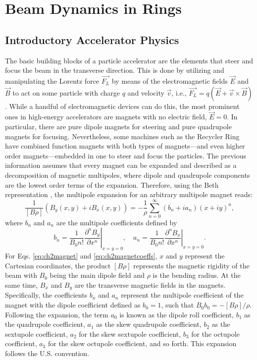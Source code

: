 \chapter{Beam Dynamics in Rings}
\label{sec:ch2}

\section{\label{sec:basic}Introductory Accelerator Physics}
The basic building blocks of a particle accelerator are the elements that steer and focus the beam in the transverse direction. This is done by utilizing and manipulating the Lorentz force $\vec{F_L}$ by means of the electromagnetic fields $\vec{E}$ and $\vec{B}$ to act on some particle with charge $q$ and velocity $\vec{v}$, i.e., $\vec{F_L}=q\left( \vec{E}+\vec{v}\times \vec{B}\right)$. While a handful of electromagnetic devices can do this, the most prominent ones in high-energy accelerators are magnets with no electric field, $\vec{E}=0$. In particular, there are pure dipole magnets for steering and pure quadrupole magnets for focusing. Nevertheless, some machines such as the Recycler Ring have combined function magnets with both types of magnets---and even higher order magnets---embedded in one to steer and focus the particles. The previous information assumes that every magnet can be expanded and described as a decomposition of magnetic multipoles, where dipole and quadrupole components are the lowest order terms of the expansion. Therefore, using the Beth representation \cite{sylee}, the multipole expansion for an arbitrary multipole magnet reads:
\begin{equation}
    \label{eq:ch2magnet}
    \frac{1}{\left[ B \rho \right]}\left(B_y(x,y)+iB_x(x,y) \right)=-\frac{1}{\rho} \sum_{n=0}^{\infty} \left( b_n+i a_n\right) \left( x+i y\right)^n, 
\end{equation}
where $b_n$ and $a_n$ are the multipole coefficients defined by
\begin{equation}
    \label{eq:ch2magnetcoeffs}
    b_n=\frac{1}{B_0 n!} \left. \frac{\partial^n B_y}{\partial x^n} \right| _{x=y=0}, \quad  a_n=\frac{1}{B_0 n!} \left. \frac{\partial^n B_x}{\partial x^n} \right| _{x=y=0}.  
\end{equation}
For Eqs. \ref{eq:ch2magnet} and \ref{eq:ch2magnetcoeffs}, $x$ and $y$ represent the Cartesian coordinates, the product $\left[ B \rho \right]$ represents the magnetic rigidity of the beam with $B_0$ being the main dipole field and $\rho$ is the bending radius. At the same time, $B_x$ and $B_y$ are the transverse magnetic fields in the magnets. Specifically, the coefficients $b_n$ and $a_n$ represent the multipole coefficient of the magnet with the dipole coefficient defined as $b_0=1$, such that $B_0b_0=-\left[ B \rho\right]/\rho$. Following the expansion, the term $a_0$ is known as the dipole roll coefficient, $b_1$ as the quadrupole coefficient, $a_1$ as the skew quadrupole coefficient, $b_2$ as the sextupole coefficient, $a_2$ for the skew sextupole coefficient, $b_3$ for the octupole coefficient, $a_3$ for the skew octupole coefficient, and so forth. This expansion follows the U.S. convention.

